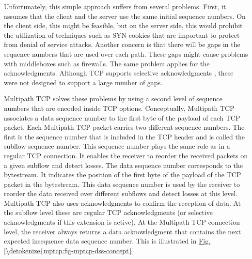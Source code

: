 \documentclass[letterpaper,10pt,english]{sphinxmanual}
\begin{document}
\sphinxAtStartPar
Unfortunately, this simple approach suffers from several problems. First, it assumes that the client and the server use the same initial sequence numbers. On the client side, this might be feasible, but on the server side, this would prohibit the utilization of techniques such as SYN cookies that are important to protect from denial of service attacks. Another concern is that there will be gaps in the sequence numbers that are used over each path. These gaps might cause problems with middleboxes such as firewalls. The same problem applies for the acknowledgments. Although TCP supports selective acknowledgments , these were not designed to support a large number of gaps.

\sphinxAtStartPar
Multipath TCP solves these problems by using a second level of sequence numbers that are encoded inside TCP options. Conceptually, Multipath TCP associates a data sequence number to the first byte of the payload of each TCP packet. Each Multipath TCP packet carries two different sequence numbers. The first is the sequence number that is included in the TCP header and is called the subflow sequence number. This sequence number plays the same role as in a regular TCP connection. It enables the receiver to reorder the received packets on a given subflow and detect losses. The data sequence number corresponds to the bytestream. It indicates the position of the first byte of the payload of the TCP packet in the bytestream. This data sequence number is used by the receiver to reorder the data received over different subflows and detect losses at this level. Multipath TCP also uses acknowledgments to confirm the reception of data. At the subflow level these are regular TCP acknowledgments (or selective acknowledgments if this extension is active). At the Multipath TCP connection level, the receiver always returns a data acknowledgment that contains the next expected in\sphinxhyphen{}sequence data sequence number. This is illustrated in \hyperref[\detokenize{mptcp:fig-mptcp-dss-concept}]{Fig.\@ \ref{\detokenize{mptcp:fig-mptcp-dss-concept}}}.
\end{document}
